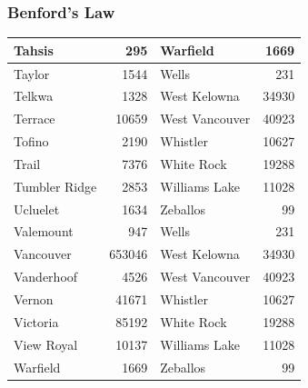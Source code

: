 \documentclass[xcolor=dvipsnames]{beamer}
\begin{document}
\begin{frame}
  \frametitle{Benford's Law}
\begin{tabular}{|l|r|l|r|}
\hline
Tahsis        & 295    & Warfield       & 1669  \\
\hline
Taylor        & 1544   & Wells          & 231   \\
\hline
Telkwa        & 1328   & West Kelowna   & 34930 \\
\hline
Terrace       & 10659  & West Vancouver & 40923 \\
\hline
Tofino        & 2190   & Whistler       & 10627 \\
\hline
Trail         & 7376   & White Rock     & 19288 \\
\hline
Tumbler Ridge & 2853   & Williams Lake  & 11028 \\
\hline
Ucluelet      & 1634   & Zeballos       & 99    \\
\hline
Valemount     & 947    & Wells          & 231   \\
\hline
Vancouver     & 653046 & West Kelowna   & 34930 \\
\hline
Vanderhoof    & 4526   & West Vancouver & 40923 \\
\hline
Vernon        & 41671  & Whistler       & 10627 \\
\hline
Victoria      & 85192  & White Rock     & 19288 \\
\hline
View Royal    & 10137  & Williams Lake  & 11028 \\
\hline
Warfield      & 1669   & Zeballos       & 99    \\
\hline
\end{tabular}

\end{frame}
\end{document}
